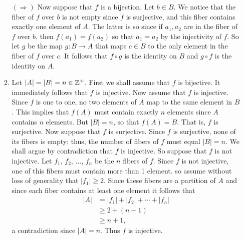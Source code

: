 \begin{enumerate}
\begin{enumerate}
               $(\Rightarrow)$ Now suppose that $f$ is a bijection. Let
               $b \in B$. We notice that the fiber of $f$ over $b$ is not 
               empty since $f$ is surjective, and this fiber contains exactly 
               one element of $A$. The latter is so since if $a_1, a_2$ are in 
               the fiber of $f$ over $b$, then $f(a_1) = f(a_2)$ so that 
               $a_1 = a_2$ by the injectivity of $f$. So let $g$ be the map
               $g : B \rightarrow A$ that maps $c \in B$ to the only element in 
               the fiber of $f$ over $c$. It follows that $f \circ g$ is the
               identity on $B$ and $g \circ f$ is the identity on $A$.

         \item Let $|A| = |B| = n \in \mathbb{Z}^+$. First we shall assume that $f$ is
               bijective. It immediately follows that $f$ is injective. Now 
               assume that $f$ is injective. Since $f$ is one to one, no two 
               elements of $A$ map to the same element in $B$. This implies that
               $f(A)$ must contain exactly $n$ elements since $A$ contains $n$ 
               elements. But $|B| = n$, so that $f(A) = B$. That is, $f$ is 
               surjective. Now suppose that $f$ is surjective. Since $f$ is
               surjective, none of its fibers is empty; thus, the number of
               fibers of $f$ must equal $|B| = n$. We shall argue by    
               contradiction that $f$ is injective. So suppose that $f$ is not
               injective. Let $f_1$, $f_2$, $\ldots$, $f_n$ be the $n$ fibers of
               $f$. Since $f$ is not injective, one of this fibers must contain
               more than 1 element. so assume without loss of generality that
               $|f_1| \ge 2$. Since these fibers are a partition of $A$ and
               since each fiber contains at least one element it follows that
               \begin{align*}
                  |A| &= |f_1| + |f_2| + \cdots + |f_n| \\
                      &\ge 2 + (n - 1) \\
                      &\ge n + 1,
               \end{align*}
               a contradiction since $|A| = n$. Thus $f$ is injective.	
      \end{enumerate}
\end{enumerate}
